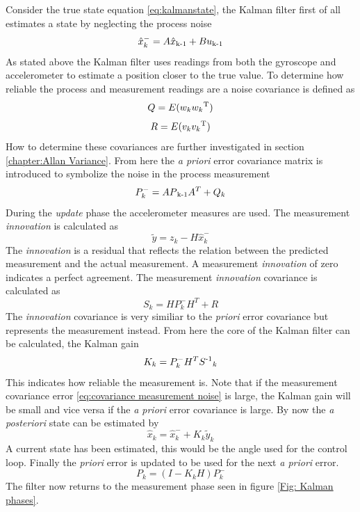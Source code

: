 \documentclass[a4paper,11pt]{kth-mag}
\begin{document}
Consider the true state equation \eqref{eq:kalmanstate}, the Kalman filter first of all estimates a state by neglecting the process noise
\begin{equation} \label{eq:Kalman first estimate}
\hat{x}^-_k = A\hat{x}\textsubscript{k-1}+Bu\textsubscript{k-1}
\end{equation}
As stated above the Kalman filter uses readings from both the gyroscope and accelerometer to estimate a position closer to the true value. To determine how reliable the process and measurement readings are a noise covariance is defined as
\begin{equation} \label{eq:covariance process noise}
Q = E(w_k w_k \textsuperscript{T})
\end{equation}
\begin{equation} \label{eq:covariance measurement noise}
R = E(v_k v_k \textsuperscript{T} )
\end{equation}
How to determine these covariances are further investigated in section  \ref{chapter:Allan Variance}.
From here the \textit{a priori} error covariance matrix is introduced to symbolize the noise in the process measurement
\begin{equation}
P^-_k = AP\textsubscript{k-1}A^T + Q_k
\end{equation}
During the \textit{update} phase the accelerometer measures are used. The measurement \textit{innovation} is calculated as
\begin{equation} \label{eq: innovation}
\tilde{y} = z_k - H\hat{x}^-_k
\end{equation}
The \textit{innovation} is a residual that reflects the relation between the predicted measurement and the actual measurement. A measurement \textit{innovation} of zero indicates a perfect agreement.
The measurement \textit{innovation} covariance is calculated as
\begin{equation} \label{eq:innovation cov}
S_k = HP^-_kH^T + R
\end{equation}
The \textit{innovation} covariance is very similiar to the \textit{priori} error covariance but represents the measurement instead. From here the core of the Kalman filter can be calculated, the Kalman gain
\begin{equation} \label{eq:Kalman gain}
K_k = P^-_kH^TS\textsuperscript{-1}_k
\end{equation}
This indicates how reliable the measurement is. Note that if the measurement covariance error \eqref{eq:covariance measurement noise} is large, the Kalman gain will be small and vice versa if the \textit{a priori} error covariance is large.
By now the \textit{a posteriori} state can be estimated by
\begin{equation}
\hat{x}_k = \hat{x}^-_k + K_k\tilde{y}_k
\end{equation}
A current state has been estimated, this would be the angle used for the control loop. Finally the \textit{priori} error is updated to be used for the next \textit{a priori} error.
\begin{equation}
P_k=(I-K_kH)P^-_k
\end{equation} 
The filter now returns to the measurement phase seen in figure \ref{Fig: Kalman phases}.
\end{document}
